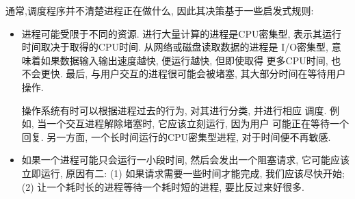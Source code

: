 \documentclass[12pt]{book}
\begin{document}
{%
通常,调度程序并不清楚进程正在做什么, 因此其决策基于一些启发式规则:


\begin{itemize}

\item 进程可能受限于不同的资源. 进行大量计算的进程是CPU密集型, 
表示其运行时间取决于取得的CPU时间. 从网络或磁盘读取数据的进程是
I/O密集型, 意味着如果数据输入输出速度越快, 便运行越快, 但即使取得
更多CPU时间, 也不会更快. 最后, 与用户交互的进程很可能会被堵塞, 
其大部分时间在等待用户操作.

操作系统有时可以根据进程过去的行为, 对其进行分类, 并进行相应
调度. 例如, 当一个交互进程解除堵塞时, 它应该立刻运行, 因为用户
可能正在等待一个回复. 另一方面, 一个长时间运行的CPU密集型进程,
对于时间便不再敏感.

\item 如果一个进程可能只会运行一小段时间, 然后会发出一个阻塞请求, 它可能应该立即运行, 原因有二: (1) 如果请求需要一些时间才能完成, 我们应该尽快开始; (2) 让一个耗时长的进程等待一个耗时短的进程, 要比反过来好很多. 


\end{itemize}}
\end{document}
